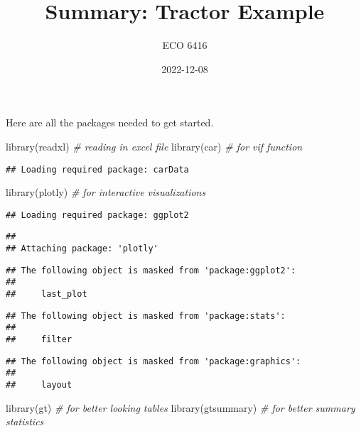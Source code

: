\documentclass[
]{article}
\title{Summary: Tractor Example}
\author{ECO 6416}
\date{2022-12-08}
\newenvironment{Shaded}{\begin{snugshade}}{\end{snugshade}}
\newcommand{\CommentTok}[1]{\textcolor[rgb]{0.56,0.35,0.01}{\textit{#1}}}
\newcommand{\FunctionTok}[1]{\textcolor[rgb]{0.00,0.00,0.00}{#1}}
\newcommand{\NormalTok}[1]{#1}
\begin{document}
\maketitle

{
\setcounter{tocdepth}{2}
\tableofcontents
}
Here are all the packages needed to get started.

\begin{Shaded}
\begin{Highlighting}[]
\FunctionTok{library}\NormalTok{(readxl) }\CommentTok{\# reading in excel file}
\FunctionTok{library}\NormalTok{(car) }\CommentTok{\# for vif function}
\end{Highlighting}
\end{Shaded}

\begin{verbatim}
## Loading required package: carData
\end{verbatim}

\begin{Shaded}
\begin{Highlighting}[]
\FunctionTok{library}\NormalTok{(plotly) }\CommentTok{\# for interactive visualizations}
\end{Highlighting}
\end{Shaded}

\begin{verbatim}
## Loading required package: ggplot2
\end{verbatim}

\begin{verbatim}
## 
## Attaching package: 'plotly'
\end{verbatim}

\begin{verbatim}
## The following object is masked from 'package:ggplot2':
## 
##     last_plot
\end{verbatim}

\begin{verbatim}
## The following object is masked from 'package:stats':
## 
##     filter
\end{verbatim}

\begin{verbatim}
## The following object is masked from 'package:graphics':
## 
##     layout
\end{verbatim}

\begin{Shaded}
\begin{Highlighting}[]
\FunctionTok{library}\NormalTok{(gt) }\CommentTok{\# for better looking tables}
\FunctionTok{library}\NormalTok{(gtsummary) }\CommentTok{\# for better summary statistics}
\end{Highlighting}
\end{Shaded}
\end{document}
